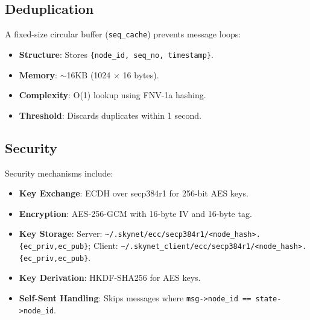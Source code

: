 \documentclass{article}
\begin{document}
\subsection{Deduplication}
A fixed-size circular buffer (\texttt{seq\_cache}) prevents message loops:
\begin{itemize}
    \item \textbf{Structure}: Stores \texttt{\{node\_id, seq\_no, timestamp\}}.
    \item \textbf{Memory}: $\sim$16KB (1024 $\times$ 16 bytes).
    \item \textbf{Complexity}: O(1) lookup using FNV-1a hashing.
    \item \textbf{Threshold}: Discards duplicates within 1 second.
\end{itemize}

\subsection{Security}
\label{subsec:security}
Security mechanisms include:
\begin{itemize}
    \item \textbf{Key Exchange}: ECDH over secp384r1 for 256-bit AES keys.
    \item \textbf{Encryption}: AES-256-GCM with 16-byte IV and 16-byte tag.
    \item \textbf{Key Storage}: Server:
          \texttt{\textasciitilde/.skynet/ecc/secp384r1/<node\_hash>.\{ec\_priv,ec\_pub\}};
          Client:
          \texttt{\textasciitilde/.skynet\_client/ecc/secp384r1/<node\_hash>.\{ec\_priv,ec\_pub\}}.
    \item \textbf{Key Derivation}: HKDF-SHA256 for AES keys.
    \item \textbf{Self-Sent Handling}: Skips messages where
          \texttt{msg->node\_id == state->node\_id}.
\end{itemize}
\end{document}
